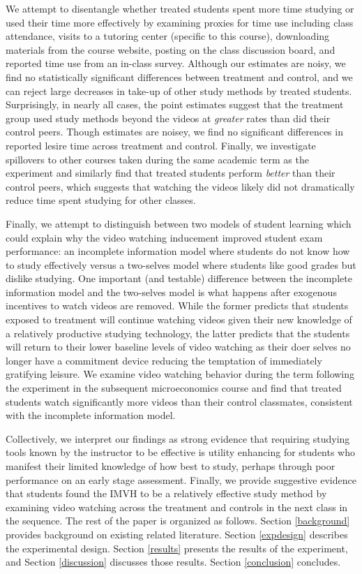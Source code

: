 \documentclass[12pt]{article}
\begin{document}
We attempt to disentangle whether treated students spent more time studying or used their time more effectively by examining proxies for time use including class attendance, visits to a tutoring center (specific to this course), downloading materials from the course website, posting on the class discussion board, and reported time use from an in-class survey. Although our estimates are noisy, we find no statistically significant differences between treatment and control, and we can reject large decreases in take-up of other study methods by treated students. Surprisingly, in nearly all cases, the point estimates suggest that the treatment group used study methods beyond the videos at \textit{greater} rates than did their control peers. Though estimates are noisey, we find no significant differences in reported lesire time across treatment and control. Finally, we investigate spillovers to other courses taken during the same academic term as the experiment and similarly find that treated students perform \textit{better} than their control peers, which suggests that watching the videos likely did not dramatically reduce time spent studying for other classes.

Finally, we attempt to distinguish between two models of student learning which could explain why the video watching inducement improved student exam performance: an incomplete information model where students do not know how to study effectively versus a two-selves model where students like good grades but dislike studying. One important (and testable) difference between the incomplete information model and the two-selves model is what happens after exogenous incentives to watch videos are removed. While the former predicts that students exposed to treatment will continue watching videos given their new knowledge of a relatively productive studying technology, the latter predicts that the students will return to their lower baseline levels of video watching as their doer selves no longer have a commitment device reducing the temptation of immediately gratifying leisure. We examine video watching behavior during the term following the experiment in the subsequent microeconomics course and find that treated students watch significantly more videos than their control classmates, consistent with the incomplete information model.

Collectively, we interpret our findings as strong evidence that requiring studying tools known by the instructor to be effective is utility enhancing for students who manifest their limited knowledge of how best to study, perhaps through poor performance on an early stage assessment. Finally, we provide suggestive evidence that students found the IMVH to be a relatively effective study method by examining video watching across the treatment and controls in the next class in the sequence. The rest of the paper is organized as follows. Section \ref{background} provides background on existing related literature. Section \ref{expdesign} describes the experimental design. Section \ref{results} presents the results of the experiment, and Section \ref{discussion} discusses those results. Section \ref{conclusion} concludes.
\end{document}

